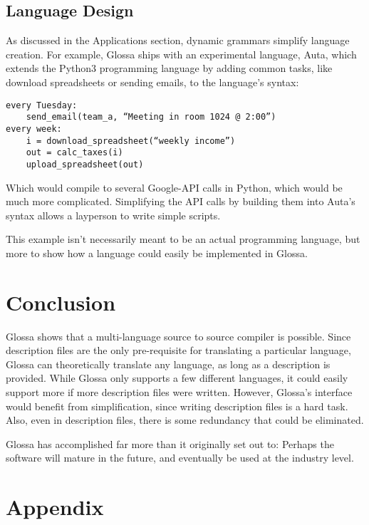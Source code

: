 \documentclass{article}
\begin{document}
\subsection{Language Design}

As discussed in the Applications section, dynamic grammars simplify language creation.
For example, Glossa ships with an experimental language, Auta, which extends the Python3 programming language by adding common tasks, like download spreadsheets or sending emails, to the language's syntax:

\lstset{language=Python}
\begin{lstlisting}
every Tuesday:
    send_email(team_a, “Meeting in room 1024 @ 2:00”)
every week:
    i = download_spreadsheet(“weekly income”)
    out = calc_taxes(i)
    upload_spreadsheet(out)
\end{lstlisting}
Which would compile to several Google-API calls in Python, which would be much more complicated. 
Simplifying the API calls by building them into Auta's syntax allows a layperson to write simple scripts.

This example isn't necessarily meant to be an actual programming language, but more to show how a language could easily be implemented in Glossa.

\section{Conclusion}

Glossa shows that a multi-language source to source compiler is possible. 
Since description files are the only pre-requisite for translating a particular language, Glossa can theoretically translate any language, as long as a description is provided.
While Glossa only supports a few different languages, it could easily support more if more description files were written.
However, Glossa's interface would benefit from simplification, since writing description files is a hard task. Also, even in description files, there is some redundancy that could be eliminated.

Glossa has accomplished far more than it originally set out to: Perhaps the software will mature in the future, and eventually be used at the industry level.

\section{Appendix}
\end{document}
